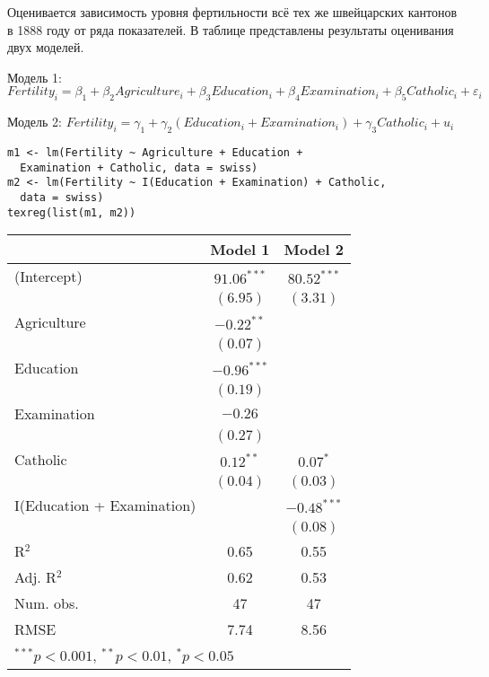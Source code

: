\begin{problem}
Оценивается зависимость уровня фертильности всё тех же швейцарских кантонов в 1888 году от ряда показателей. В таблице представлены результаты оценивания двух моделей.

Модель 1: $Fertility_i=\beta_1+\beta_2 Agriculture_i+\beta_3 Education_i+\beta_4 Examination_i+\beta_5 Catholic_i+\varepsilon_i$

Модель 2: $Fertility_i=\gamma_1+\gamma_2 (Education_i+Examination_i)+\gamma_3 Catholic_i+u_i$

\begin{verbatim}
m1 <- lm(Fertility ~ Agriculture + Education +
  Examination + Catholic, data = swiss)
m2 <- lm(Fertility ~ I(Education + Examination) + Catholic,
  data = swiss)
texreg(list(m1, m2))
\end{verbatim}


\begin{tabular}{l c c }
\hline
 & Model 1 & Model 2 \\
\hline
(Intercept)                & $91.06^{***}$ & $80.52^{***}$ \\
                           & $(6.95)$      & $(3.31)$      \\
Agriculture                & $-0.22^{**}$  &               \\
                           & $(0.07)$      &               \\
Education                  & $-0.96^{***}$ &               \\
                           & $(0.19)$      &               \\
Examination                & $-0.26$       &               \\
                           & $(0.27)$      &               \\
Catholic                   & $0.12^{**}$   & $0.07^{*}$    \\
                           & $(0.04)$      & $(0.03)$      \\
I(Education + Examination) &               & $-0.48^{***}$ \\
                           &               & $(0.08)$      \\
\hline
R$^2$                      & 0.65          & 0.55          \\
Adj. R$^2$                 & 0.62          & 0.53          \\
Num. obs.                  & 47            & 47            \\
RMSE                       & 7.74          & 8.56          \\
\hline
\multicolumn{3}{l}{\scriptsize{$^{***}p<0.001$, $^{**}p<0.01$, $^*p<0.05$}}
\end{tabular}




\end{problem}
